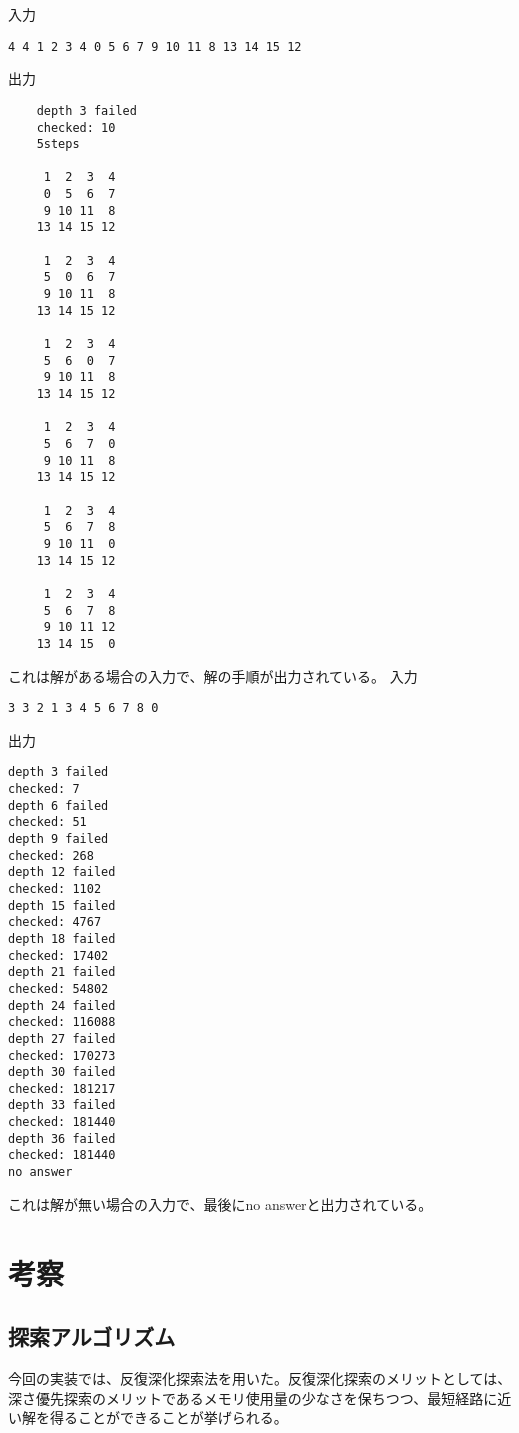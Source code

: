 \documentclass[a4paper,11pt]{ltjsarticle}
\begin{document}
入力
\begin{screen}
  \begin{verbatim}
4 4 1 2 3 4 0 5 6 7 9 10 11 8 13 14 15 12
\end{verbatim}
\end{screen}

出力
\begin{screen}
  \setlength{\baselineskip}{4mm}
  \begin{verbatim}
    depth 3 failed
    checked: 10
    5steps

     1  2  3  4
     0  5  6  7
     9 10 11  8
    13 14 15 12

     1  2  3  4
     5  0  6  7
     9 10 11  8
    13 14 15 12

     1  2  3  4
     5  6  0  7
     9 10 11  8
    13 14 15 12

     1  2  3  4
     5  6  7  0
     9 10 11  8
    13 14 15 12

     1  2  3  4
     5  6  7  8
     9 10 11  0
    13 14 15 12

     1  2  3  4
     5  6  7  8
     9 10 11 12
    13 14 15  0
\end{verbatim}
\end{screen}
これは解がある場合の入力で、解の手順が出力されている。
\newpage
入力
\begin{screen}
  \begin{verbatim}
3 3 2 1 3 4 5 6 7 8 0
  \end{verbatim}
\end{screen}

出力
\begin{screen}
  \setlength{\baselineskip}{4mm}
  \begin{verbatim}
depth 3 failed
checked: 7
depth 6 failed
checked: 51
depth 9 failed
checked: 268
depth 12 failed
checked: 1102
depth 15 failed
checked: 4767
depth 18 failed
checked: 17402
depth 21 failed
checked: 54802
depth 24 failed
checked: 116088
depth 27 failed
checked: 170273
depth 30 failed
checked: 181217
depth 33 failed
checked: 181440
depth 36 failed
checked: 181440
no answer
  \end{verbatim}
\end{screen}

これは解が無い場合の入力で、最後にno answerと出力されている。

\section{考察}
\subsection{探索アルゴリズム}
今回の実装では、反復深化探索法を用いた。反復深化探索のメリットとしては、深さ優先探索のメリットであるメモリ使用量の少なさを保ちつつ、最短経路に近い解を得ることができることが挙げられる。
\end{document}
